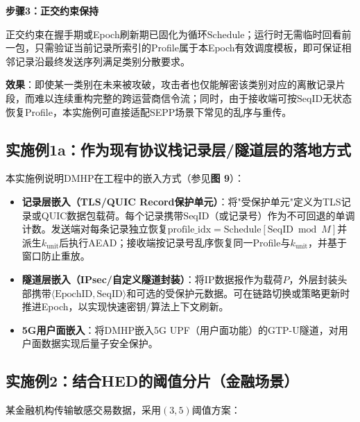 ﻿\documentclass[12pt,a4paper]{article}
\begin{document}
\textbf{步骤3：正交约束保持}

正交约束在握手期或Epoch刷新期已固化为循环$\text{Schedule}$；运行时无需临时回看前一包，只需验证当前记录所索引的Profile属于本Epoch有效调度模板，即可保证相邻记录沿最终发送序列满足类别分散要求。

\textbf{效果}：即使某一类别在未来被攻破，攻击者也仅能解密该类别对应的离散记录片段，而难以连续重构完整的跨运营商信令流；同时，由于接收端可按$\text{SeqID}$无状态恢复Profile，本实施例可直接适配SEPP场景下常见的乱序与重传。

\subsection*{实施例1a：作为现有协议栈记录层/隧道层的落地方式}

本实施例说明DMHP在工程中的嵌入方式（参见\textbf{图 9}）：

\begin{itemize}
    \item \textbf{记录层嵌入（TLS/QUIC Record保护单元）}：将"受保护单元"定义为TLS记录或QUIC数据包载荷。每个记录携带$\text{SeqID}$（或记录号）作为不可回退的单调计数。发送端对每条记录独立恢复$\text{profile\_idx}=\text{Schedule}[\text{SeqID} \bmod M]$并派生$k_{\text{unit}}$后执行AEAD；接收端按记录号乱序恢复同一Profile与$k_{\text{unit}}$，并基于窗口防止重放。
    \item \textbf{隧道层嵌入（IPsec/自定义隧道封装）}：将IP数据报作为载荷$P$，外层封装头部携带$\langle\text{EpochID},\text{SeqID}\rangle$和可选的受保护元数据。可在链路切换或策略更新时推进Epoch，以实现快速密钥/算法上下文刷新。
    \item \textbf{5G用户面嵌入}：将DMHP嵌入5G UPF（用户面功能）的GTP-U隧道，对用户面数据实现后量子安全保护。
\end{itemize}

\subsection*{实施例2：结合HED的阈值分片（金融场景）}

某金融机构传输敏感交易数据，采用$(3,5)$阈值方案：
\end{document}
